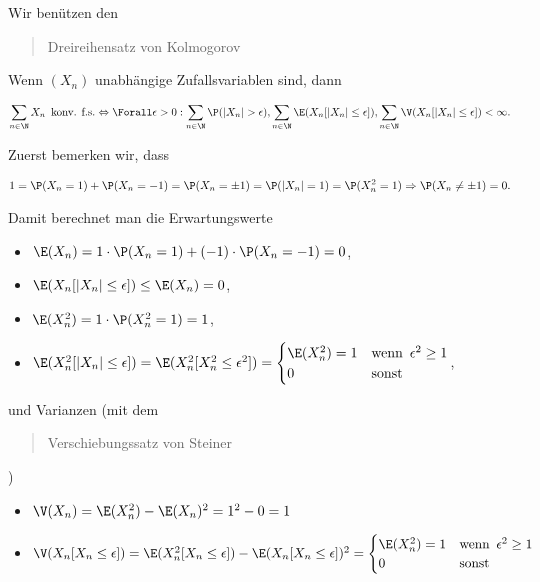 \begin{solution}

Wir benützen den \blockquote{Dreireihensatz von Kolmogorov}: Wenn $(X_n)$ unabhängige Zufallsvariablen sind, dann

\begin{align*}
  \sum_{n \in \N} X_n
  \enspace \text{konv. f.s.}
  \Leftrightarrow
  \Forall \epsilon > 0:
  \sum_{n \in \N} \P(|X_n| > \epsilon),
  \sum_{n \in \N} \E(X_n [|X_n| \leq \epsilon]),
  \sum_{n \in \N} \V(X_n [|X_n| \leq \epsilon])
  < \infty.
\end{align*}

Zuerst bemerken wir, dass

\begin{align*}
  1
  =
  \P(X_n = 1) + \P(X_n = -1)
  =
  \P(X_n = \pm 1)
  =
  \P(|X_n| = 1)
  =
  \P(X_n^2 = 1)
  \Rightarrow
  \P(X_n \neq \pm 1) = 0.
\end{align*}

Damit berechnet man die Erwartungswerte

\begin{itemize}

  \item $\E(X_n) = 1 \cdot \P(X_n = 1) + (-1) \cdot \P(X_n = -1) = 0$,

  \item $\E(X_n [|X_n| \leq \epsilon]) \leq \E(X_n) = 0$,

  \item $\E(X_n^2) = 1 \cdot \P(X_n^2 = 1) = 1$,

  \item $\E(X_n^2 [|X_n| \leq \epsilon]) = \E(X_n^2 [X_n^2 \leq \epsilon^2]) =
  \begin{cases}
    \E(X_n^2) = 1 & \text{wenn} \enspace \epsilon^2 \geq 1 \\
    0             & \text{sonst}
  \end{cases}$,

\end{itemize}

und Varianzen (mit dem \blockquote{Verschiebungssatz von Steiner})

\begin{itemize}

  \item $\V(X_n) = \E(X_n^2) - \E(X_n)^2 = 1^2 - 0 = 1$

  \item $\V(X_n [X_n \leq \epsilon]) = \E(X_n^2 [X_n \leq \epsilon]) - \E(X_n [X_n \leq \epsilon])^2 =
  \begin{cases}
    \E(X_n^2) = 1 & \text{wenn} \enspace \epsilon^2 \geq 1 \\
    0             & \text{sonst}
  \end{cases}$


\end{itemize}
\end{solution}
